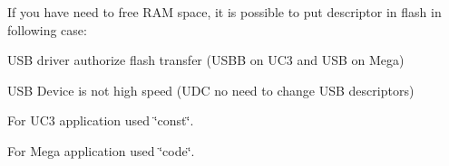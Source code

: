 If you have need to free R\-A\-M space, it is possible to put descriptor in flash in following case\-:
\begin{DoxyItemize}
\item U\-S\-B driver authorize flash transfer (U\-S\-B\-B on U\-C3 and U\-S\-B on Mega)
\item U\-S\-B Device is not high speed (U\-D\-C no need to change U\-S\-B descriptors)
\end{DoxyItemize}

For U\-C3 application used \char`\"{}const\char`\"{}.

For Mega application used \char`\"{}code\char`\"{}. 